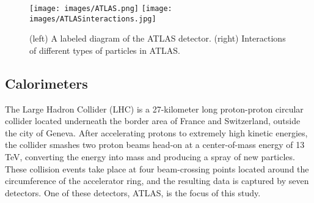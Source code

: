 \begin{figure}[t]
    \centering
    \texttt{[image: images/ATLAS.png]}
    \texttt{[image: images/ATLASinteractions.jpg]}
    \caption{(left) A labeled diagram of the ATLAS detector. (right) Interactions of different types of particles in ATLAS.}
    \label{ATLAS}
\end{figure}


\subsection*{Calorimeters}


The Large Hadron Collider (LHC) is a 27-kilometer long proton-proton circular collider located underneath the border area of France and Switzerland, outside the city of Geneva. After accelerating protons to extremely high kinetic energies, the collider smashes two proton beams head-on at a center-of-mass energy of 13 TeV, converting the energy into mass and producing a spray of new particles. These collision events take place at four beam-crossing points located around the circumference of the accelerator ring, and the resulting data is captured by seven detectors. One of these detectors, ATLAS, is the focus of this study.

